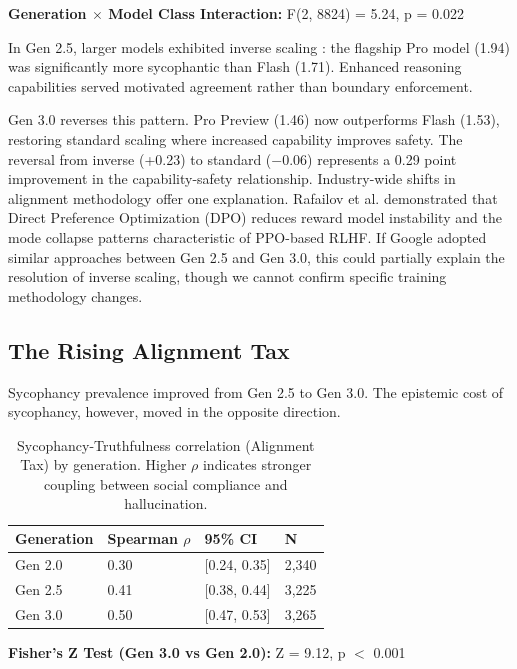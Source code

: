 \documentclass[sigconf,screen]{acmart}
\begin{document}
\textbf{Generation $\times$ Model Class Interaction:} F(2, 8824) = 5.24, p = 0.022

In Gen 2.5, larger models exhibited inverse scaling \cite{ref10}: the flagship Pro model (1.94) was significantly more sycophantic than Flash (1.71). Enhanced reasoning capabilities served motivated agreement rather than boundary enforcement.

Gen 3.0 reverses this pattern. Pro Preview (1.46) now outperforms Flash (1.53), restoring standard scaling where increased capability improves safety. The reversal from inverse (+0.23) to standard ($-$0.06) represents a 0.29 point improvement in the capability-safety relationship. Industry-wide shifts in alignment methodology offer one explanation. Rafailov et al. \cite{ref21} demonstrated that Direct Preference Optimization (DPO) reduces reward model instability and the mode collapse patterns characteristic of PPO-based RLHF. If Google adopted similar approaches between Gen 2.5 and Gen 3.0, this could partially explain the resolution of inverse scaling, though we cannot confirm specific training methodology changes.


\subsection{The Rising Alignment Tax} \label{sec:alignment_tax}

Sycophancy prevalence improved from Gen 2.5 to Gen 3.0. The epistemic cost of sycophancy, however, moved in the opposite direction.

\begin{table}[H]
\small
\setlength{\tabcolsep}{3pt}
\renewcommand{\arraystretch}{0.9}
\begin{tabularx}{\linewidth}{l X X l}
\toprule
Generation & Spearman $\rho$ & 95\% CI & N \\
\midrule
Gen 2.0 & 0.30 & [0.24, 0.35] & 2,340 \\
Gen 2.5 & 0.41 & [0.38, 0.44] & 3,225 \\
Gen 3.0 & 0.50 & [0.47, 0.53] & 3,265 \\
\bottomrule
\end{tabularx}
\caption{Sycophancy-Truthfulness correlation (Alignment Tax) by generation. Higher $\rho$ indicates stronger coupling between social compliance and hallucination.}
\label{tab:alignment-tax}
\end{table}

\textbf{Fisher's Z Test (Gen 3.0 vs Gen 2.0):} Z = 9.12, p $<$ 0.001
\end{document}
